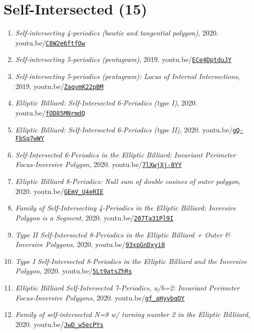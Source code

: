 \documentclass[12pt]{article}
\begin{document}
\section{Self-Intersected (15)}

\begin{enumerate}[resume]
\item \textit{Self-intersecting 4-periodics (bowtie and tangential polygon)}, 2020. youtu.be/\href{https://youtu.be/C8W2e6ftfOw}{\nolinkurl{C8W2e6ftfOw}}
\item \textit{Self-intersecting 5-periodics (pentagram)}, 2019. youtu.be/\href{https://youtu.be/ECe4DptduJY}{\nolinkurl{ECe4DptduJY}}
\item \textit{Self-intersecting 5-periodics (pentagram): Locus of Internal Intersections}, 2019. youtu.be/\href{https://youtu.be/ZaqvmK22pBM}{\nolinkurl{ZaqvmK22pBM}}
\item \textit{Elliptic Billiard: Self-Intersected 6-Periodics (type I)}, 2020. youtu.be/\href{https://youtu.be/fOD85MNrmdQ}{\nolinkurl{fOD85MNrmdQ}}
\item \textit{Elliptic Billiard: Self-Intersected 6-Periodics (type II)}, 2020. youtu.be/\href{https://youtu.be/gQ-FbSq7wWY}{\nolinkurl{gQ-FbSq7wWY}}
\item \textit{Self-Intersected 6-Periodics in the Elliptic Billiard: Invariant Perimeter Focus-Inversive Polygon}, 2020. youtu.be/\href{https://youtu.be/7lXwjXj-8YY}{\nolinkurl{7lXwjXj-8YY}}
\item \textit{Elliptic Billiard 8-Periodics: Null sum of double cosines of outer polygon}, 2020. youtu.be/\href{https://youtu.be/GEmV_U4eRIE}{\nolinkurl{GEmV\_U4eRIE}}
\item \textit{Family of Self-Intersecting 4-Periodics in the Elliptic Billiard: Inversive Polygon is a Segment}, 2020. youtu.be/\href{https://youtu.be/207Ta31Pl9I}{\nolinkurl{207Ta31Pl9I}}
\item \textit{Type II Self-Intersected 8-Periodics in the Elliptic Billiard + Outer \& Inversive Polygons}, 2020. youtu.be/\href{https://youtu.be/93xpGnDxyi0}{\nolinkurl{93xpGnDxyi0}}
\item \textit{Type I Self-Intersected 8-Periodics in the Elliptic Billiard and the Inversive Polygon}, 2020. youtu.be/\href{https://youtu.be/5Lt9atsZhRs}{\nolinkurl{5Lt9atsZhRs}}
\item \textit{Elliptic Billiard Self-Intersected 7-Periodics, a/b=2: Invariant Perimeter Focus-Inversive Polygons}, 2020. youtu.be/\href{https://youtu.be/gf_aHyvbqOY}{\nolinkurl{gf\_aHyvbqOY}}
\item \textit{Family of self-intersected N=8 w/ turning number 2 in the Elliptic Billiiard}, 2020. youtu.be/\href{https://youtu.be/JwD_w5ecPYs}{\nolinkurl{JwD\_w5ecPYs}}

\end{enumerate}
\end{document}
